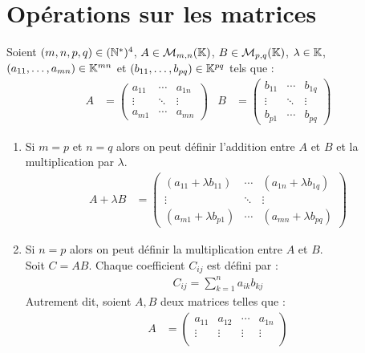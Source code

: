 \section{Opérations sur les matrices}
\begin{definition}
	Soient $(m,n,p,q) \in (\mathbb{N}^*)^4$, $A \in \mathcal{M}_{m, n}(\mathbb{K})$, $B \in \mathcal{M}_{p, q}(\mathbb{K})$, $\lambda \in \mathbb{K}$, $(a_{11}, \ldots, a_{mn}) \in \mathbb{K}^{mn}$ et $(b_{11}, \ldots, b_{pq}) \in \mathbb{K}^{pq}$ tels que :
	\begin{align*}
		A &=
		\begin{pmatrix}
			a_{11} & \cdots & a_{1n} \\
			\vdots & \ddots & \vdots \\
			a_{m1} & \cdots & a_{mn}
		\end{pmatrix}
		&
		B &= 
		\begin{pmatrix}
			b_{11} & \cdots & b_{1q} \\
			\vdots & \ddots & \vdots \\
			b_{p1} & \cdots & b_{pq}
		\end{pmatrix}
	\end{align*}
	\begin{enumerate}
		\item Si $m = p$ et $n = q$ alors on peut définir l'addition entre $A$ et $ B$ et la multiplication par $\lambda$.
		\begin{align*}
			A + \lambda B &= 
			\begin{pmatrix}
				(a_{11} + \lambda b_{11}) & \cdots & (a_{1n} + \lambda b_{1q}) \\
				\vdots & \ddots & \vdots \\
				(a_{m1} + \lambda b_{p1}) & \cdots & (a_{mn} + \lambda b_{pq})
			\end{pmatrix}
		\end{align*}
		\item Si $n = p$ alors on peut définir la multiplication entre $A$ et $B$.\\
		Soit $C = AB$. Chaque coefficient $C_{ij}$ est défini par :
		\begin{align*}
			C_{ij} = \sum_{k=1}^{n} a_{ik} b_{kj}
		\end{align*}
        Autrement dit, soient $A, B$ deux matrices telles que :
        \begin{align*}
            A &= 
            \begin{pmatrix}
                a_{11} & a_{12} & \cdots & a_{1n} \\ 
                \vdots & \vdots & \vdots & \vdots \\

\end{pmatrix}
\end{align*}
\end{enumerate}
\end{definition}
